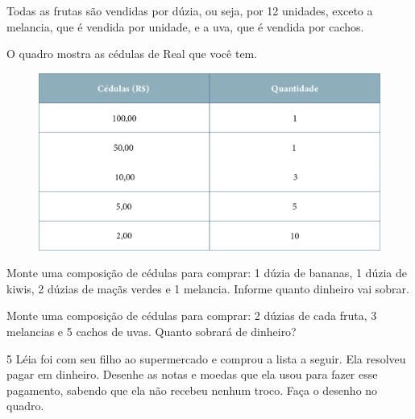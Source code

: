 Todas as frutas são vendidas por dúzia, ou seja, por 12 unidades, exceto
a melancia, que é vendida por unidade, e a uva, que é vendida por cachos.

O quadro mostra as cédulas de Real que você tem.

\begin{figure}[htpb!]
\includegraphics[width=\textwidth]{./media/image66.png}
\end{figure}

\begin{escolha}[itemsep=-5pt]
\item Monte uma composição de cédulas para comprar: 1 dúzia de bananas, 1 dúzia de kiwis, 2 dúzias de maçãs verdes e 1 melancia. Informe quanto dinheiro vai sobrar.

\item Monte uma composição de cédulas para comprar: 2 dúzias de cada fruta, 3 melancias e 5 cachos de uvas. Quanto sobrará de dinheiro?
\hfill

\end{escolha}

\num{5} Léia foi com seu filho ao supermercado e comprou a lista a seguir. Ela
resolveu pagar em dinheiro. Desenhe as notas e moedas que ela usou para
fazer esse pagamento, sabendo que ela não recebeu nenhum troco. Faça o
desenho no quadro.


